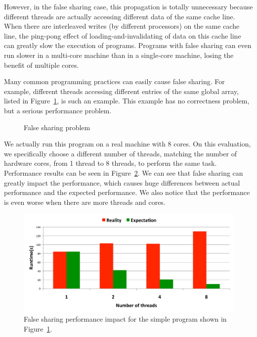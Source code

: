 However, in the false sharing case, this propagation is totally unnecessary because different threads are  actually accessing different data of the same cache line. 
When there are interleaved writes (by different processors) on the same cache line, the ping-pong effect of loading-and-invalidating of data on this cache line can greatly slow the execution of programs. 
Programs with false sharing can even run slower in a multi-core machine than in a single-core machine, losing the benefit of multiple cores.  

Many common programming practices can easily cause false sharing. For example, different threads accessing different entries of the same global array, listed in Figure~\ref{fig:falsesharingexample}, is such an example. This example has no correctness problem, but a serious performance problem. 

\begin{figure}[!ht]
{\centering
\fbox{
\subfigure{}
\hspace{20pt}
\subfigure{}
}
\caption{False sharing problem
\label{fig:falsesharingexample}}
}
\end{figure}

We actually run this program on a real machine with 8 cores. On this evaluation, we specifically choose a different number of threads, matching the number of hardware cores, from 1 thread to 8 threads, to perform the same task. Performance results can be seen in Figure~\ref{fig:fsperfimpact}. We can see that false sharing can greatly impact the performance, which causes huge differences between actual performance and the expected performance. We also notice that the performance is even worse when there are more threads and cores. 

\begin{figure}[!t]
\centering
\includegraphics[width=5in]{fig/fsperfimpact.pdf}
\caption{
False sharing performance impact for the simple program shown in Figure~\ref{fig:falsesharingexample}.
\label{fig:fsperfimpact}
}
\end{figure}

